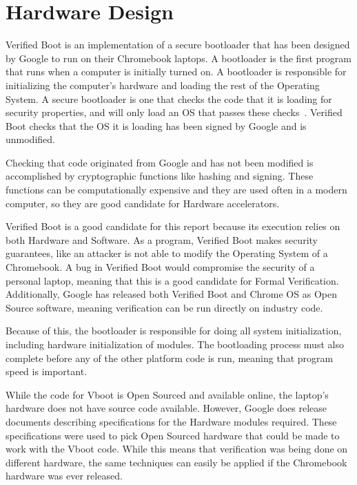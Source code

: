 \documentclass[../report.tex]{subfiles}
\begin{document}
\onehalfspacing

\newpage
\section{Hardware Design}

Verified Boot is an implementation of a secure bootloader that has been designed by Google to run on their Chromebook laptops.
A bootloader is the first program that runs when a computer is initially turned
on.
A bootloader is responsible for initializing the computer's hardware and
loading the rest of the Operating System.
A secure bootloader is one that checks the code that it is loading for security
properties, and will only load an OS that passes these checks~\cite{secure-bootloader}.
Verified Boot checks that the OS it is loading has been signed by Google and is
unmodified.

Checking that code originated from Google and has not been modified is
accomplished by cryptographic functions like hashing and signing.
These functions can be computationally expensive and they are used often in a
modern computer, so they are good candidate for Hardware accelerators.  

Verified Boot is a good candidate for this report because its execution relies
on both Hardware and Software.
As a program, Verified Boot makes security guarantees, like an attacker is not
able to modify the Operating System of a Chromebook. 
A bug in Verified Boot would compromise the security of a personal laptop,
meaning that this is a good candidate for Formal Verification.
Additionally, Google has released both Verified Boot and Chrome OS as Open
Source software, meaning verification can be run directly on industry code.


Because of this, the bootloader is responsible for doing all system initialization, including hardware initialization of modules.
The bootloading process must also complete before any of the other platform code is run, meaning that program speed is important. 

While the code for Vboot is Open Sourced and available online, the laptop's
hardware does not have source code available.
However, Google does release documents describing specifications for the
Hardware modules required. 
These specifications were used to pick Open Sourced hardware that could be made
to work with the Vboot code. 
While this means that verification was being done on different hardware, the
same techniques can easily be applied if the Chromebook hardware was ever
released.
\end{document}
